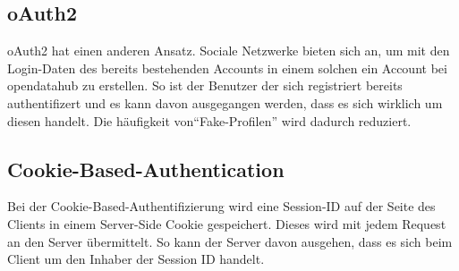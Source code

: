 \subsection{oAuth2}
oAuth2 hat einen anderen Ansatz. Sociale Netzwerke bieten sich an, um mit den Login-Daten des bereits bestehenden Accounts in einem solchen ein Account bei opendatahub zu erstellen. So ist der Benutzer der sich registriert bereits authentifizert und es kann davon ausgegangen werden, dass es sich wirklich um diesen handelt. Die häufigkeit von``Fake-Profilen'' wird dadurch reduziert.

\subsection{Cookie-Based-Authentication}
Bei der Cookie-Based-Authentifizierung wird eine Session-ID auf der Seite des Clients in einem Server-Side Cookie gespeichert. Dieses wird mit jedem Request an den Server übermittelt. So kann der Server davon ausgehen, dass es sich beim Client um den Inhaber der Session ID handelt.

